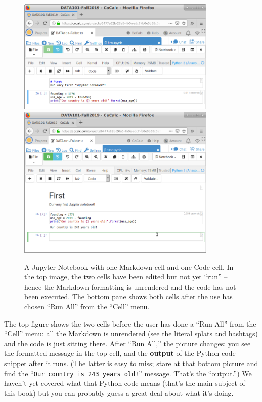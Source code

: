 \begin{figure}[!h]
\centering
\includegraphics[width=0.85\textwidth]{firstNotebook.png} \\
\bigskip
\includegraphics[width=0.85\textwidth]{firstNotebook2.png}
\medskip
\caption{A Jupyter Notebook with one Markdown cell and one Code cell. In the
top image, the two cells have been edited but not yet ``run'' -- hence
the Markdown formatting is unrendered and the code has not been executed. The
bottom pane shows both cells after the use has chosen ``Run All'' from the
``Cell'' menu.}
\label{fig:jupyterNotebook}
\end{figure}

The top figure shows the two cells before the user has done a ``Run All'' from
the ``Cell'' menu: all
the Markdown is unrendered (see the literal splats and hashtags) and the code
is just sitting there. After ``Run All,'' the picture changes:
you see the formatted message in the top cell, and the \textbf{output} of the
Python code snippet after it runs. (The latter is easy to miss; stare at that
bottom picture and find the ``\texttt{Our country is 243 years old!}'' message.
That's the ``output.'') We haven't yet covered what that Python code means
(that's the main subject of this book) but you can probably guess a great deal
about what it's doing.

